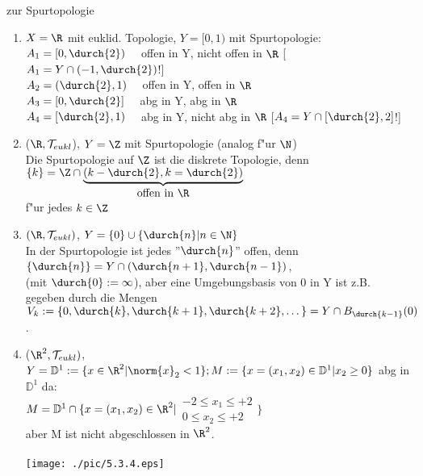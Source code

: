 \begin{beispiel}\label{5.3} zur Spurtopologie
\begin{enumerate}
\item $X=\R$ mit euklid. Topologie, $Y=[0,1)$ mit Spurtopologie:\\
$A_1=[0,\durch{2})\quad$ offen in Y, {\sc nicht} offen in $\R$ [$A_1=Y\cap(-1,\durch{2})$!]\\
$A_2=(\durch{2},1)\quad$ offen in Y, offen in $\R$\\
$A_3=[0,\durch{2}]\quad$ abg in Y, abg in $\R$\\
$A_4=[\durch{2},1)\quad$ abg in Y, {\sc nicht} abg in $\R$ [$A_4=Y\cap[\durch{2},2]$!]
\item ($\R,\T_{eukl}$), $Y=\Z$ mit Spurtopologie (analog f"ur $\N$)\\
Die Spurtopologie auf $\Z$ ist die diskrete Topologie, denn $\{ k\}=\Z \cap \underbrace{(k-\durch{2},k=\durch{2})}_{\mbox{offen in $\R$}}$\vspace*{-0.7cm}\\ f"ur jedes $k\in\Z$
\item $(\R ,\T_{eukl})$, $Y=\{ 0\}\cup \{\durch{n}|n\in\N\}$\\
In der Spurtopologie ist jedes ''$\durch{n}$'' offen, denn $\{\durch{n}\} = Y\cap (\durch{n+1},\durch{n-1})$,\\
(mit $\durch{0}:=\infty$), aber eine Umgebungsbasis von 0 in Y ist z.B. gegeben durch die Mengen $V_k:=\{0, \durch{k}, \durch{k+1}, \durch{k+2}, \dots\} = Y\cap B_\durch{k-1}(0)$.
\item ($\R^2,\T_{eukl})$, $Y=\mathbb{D}^1:=\{x\in\R^2|\norm{x}_2<1\};\\
M:=\{ x=(x_1,x_2)\in\mathbb{D}^1|x_2\geq 0\}$ abg in $\mathbb{D}^1$ da:\\
$M=\mathbb{D}^1\cap\{x=(x_1,x_2)\in\R^2|${\scriptsize$\left.\begin{array}{c}-2\leq x_1\leq +2\\0\leq x_2\leq +2\end{array}\right.$}$\}$\\
aber M ist nicht abgeschlossen in $\R^2$.\\
\vspace*{-3cm}\\
\hspace*{7cm}\texttt{[image: ./pic/5.3.4.eps]}\vspace*{-2.5cm}\\
\end{enumerate}
\end{beispiel}
